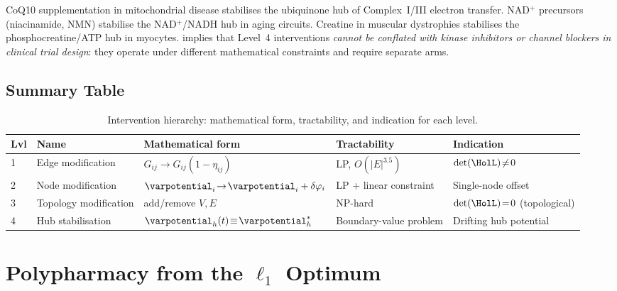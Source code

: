 \begin{remark}
CoQ10 supplementation in mitochondrial disease stabilises the ubiquinone hub of
Complex~I/III electron transfer.  NAD$^+$ precursors (niacinamide, NMN) stabilise
the NAD$^+$/NADH hub in aging circuits.  Creatine in muscular dystrophies
stabilises the phosphocreatine/ATP hub in myocytes.  
implies that Level~4 interventions \emph{cannot be conflated with kinase
inhibitors or channel blockers in clinical trial design}: they operate under
different mathematical constraints and require separate arms.
\end{remark}

\subsection{Summary Table}

\begin{table}[!htbp]
\centering
\caption{Intervention hierarchy: mathematical form, tractability, and
indication for each level.}
\label{tab:intervention-hierarchy}
\begin{tabular}{@{}p{0.5cm}p{3.2cm}p{3.8cm}p{2.5cm}p{3.2cm}@{}}
\toprule
Lvl & Name & Mathematical form & Tractability & Indication \\
\midrule
1 & Edge modification & $G_{ij}\!\to\!G_{ij}(1-\eta_{ij})$ & LP, $O(|E|^{3.5})$ & $\det(\HolL)\!\neq\!0$ \\
2 & Node modification & $\varpotential_i\!\to\!\varpotential_i+\delta\varphi_i$ & LP + linear constraint & Single-node offset \\
3 & Topology modification & add/remove $V,E$ & NP-hard & $\det(\HolL)\!=\!0$ (topological) \\
4 & Hub stabilisation & $\varpotential_h(t)\!\equiv\!\varpotential_h^*$ & Boundary-value problem & Drifting hub potential \\
\bottomrule
\end{tabular}
\end{table}

\section{Polypharmacy from the $\ell_1$ Optimum}
\label{sec:polypharmacy}


